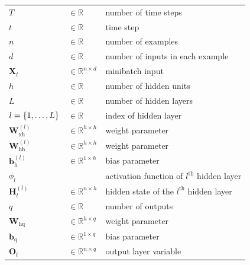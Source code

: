 \begin{customTableWrapper}{1.5}
\begin{longtable}{l l p{8cm}}
    $T$ & $\in \mathbb{R}$ & number of time steps \\

    $t$ & $\in \mathbb{R}$ & time step \\
    
    $n$ & $\in \mathbb{R}$ & number of examples \\
    
    $d$ & $\in \mathbb{R}$ & number of inputs in each example \\
    
    $\mathbf{X}_t$ & $\in \mathbb{R}^{n \times d}$ & minibatch input \\

    \hline
    
    $h$ & $\in \mathbb{R}$ & number of hidden units \\
    
    $L$ & $\in \mathbb{R}$ & number of hidden layers \\
    
    $l=\left\{1,\ldots,L\right\}$ & $\in \mathbb{R}$ & index of hidden layer \\
    
    $\mathbf{W}_{\textrm{xh}}^{(l)}$ & $\in \mathbb{R}^{h \times h}$ & weight parameter \\

    $\mathbf{W}_{\textrm{hh}}^{(l)}$ & $\in \mathbb{R}^{h \times h}$ & weight parameter \\

    $\mathbf{b}_\textrm{h}^{(l)}$ & $\in \mathbb{R}^{1 \times h}$ & bias parameter \\
    
    $\phi_l$ & & activation function of $l^{\text{th}}$ hidden layer \\
    
    $\mathbf{H}_t^{(l)}$ & $\in \mathbb{R}^{n \times h}$ & hidden state of the $l^{\text{th}}$ hidden layer \\

    \hline

    $q$ & $\in \mathbb{R}$ & number of outputs \\

    $\mathbf{W}_{\textrm{hq}}$ & $\in \mathbb{R}^{h \times q}$ & weight parameter \\

    $\mathbf{b}_\textrm{q}$ & $\in \mathbb{R}^{1 \times q}$ & bias parameter \\
    
    $\mathbf{O}_t$ & $\in \mathbb{R}^{n \times q}$ & output layer variable \\

\end{longtable}
\end{customTableWrapper}


